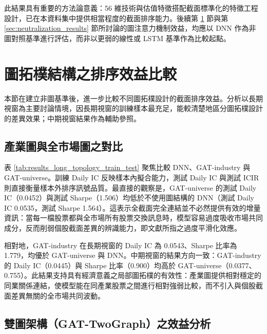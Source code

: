 此結果具有重要的方法論意義：56 維技術與估值特徵搭配截面標準化的特徵工程設計，已在本資料集中提供相當程度的截面排序能力。後續第 \ref{sec:topology_results} 節與第 \ref{sec:neutralization_results} 節所討論的圖注意力機制效益，均應以 DNN 作為非圖對照基準進行評估，而非以更弱的線性或 LSTM 基準作為比較起點。

\FloatBarrier

\section{圖拓樸結構之排序效益比較}
\label{sec:topology_results}

本節在建立非圖基準後，進一步比較不同圖拓樸設計的截面排序效益。分析以長期視窗為主要討論情境，因長期視窗的訓練樣本最充足，能較清楚地區分圖拓樸設計的差異效果；中期視窗結果作為輔助參照。

\subsection{產業圖與全市場圖之對比}
\label{subsec:industry_vs_universe}

表 \ref{tab:results_long_topology_train_test} 聚焦比較 DNN、GAT-industry 與 GAT-universe。訓練 Daily IC 反映樣本內擬合能力，測試 Daily IC 與測試 ICIR 則直接衡量樣本外排序訊號品質。最直接的觀察是，GAT-universe 的測試 Daily IC（0.0452）與測試 Sharpe（1.506）均低於不使用圖結構的 DNN（測試 Daily IC 0.0535，測試 Sharpe 1.564）。這表示全截面完全連結並不必然提供有效的增量資訊：當每一檔股票都與全市場所有股票交換訊息時，模型容易過度吸收市場共同成分，反而削弱個股截面差異的辨識能力，即文獻所指之過度平滑化效應。



相對地，GAT-industry 在長期視窗的 Daily IC 為 0.0543、Sharpe 比率為 1.779，均優於 GAT-universe 與 DNN。中期視窗的結果方向一致：GAT-industry 的 Daily IC（0.0445）與 Sharpe 比率（0.900）均高於 GAT-universe（0.0377、0.755）。此結果支持具有經濟意義之局部圖拓樸的有效性：產業圖提供相對穩定的同業關係連結，使模型能在同產業股票之間進行相對強弱比較，而不引入與個股截面差異無關的全市場共同波動。

\subsection{雙圖架構（GAT-TwoGraph）之效益分析}
\label{subsec:twograph_results}

